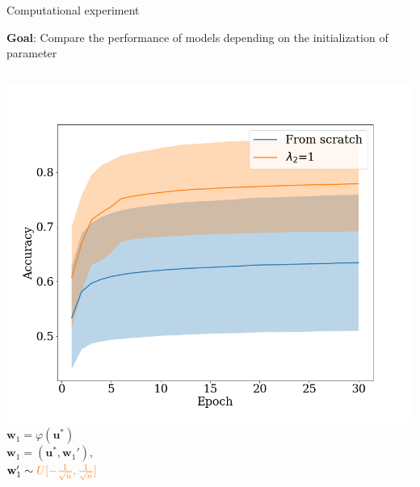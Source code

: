 \documentclass[dvipsnames]{beamer}
\begin{document}
\begin{frame}{Computational experiment}

    \textbf{Goal}: Compare the performance of models depending
on the initialization of parameter
    
    \begin{columns}[c]
    \includegraphics[width=\textwidth]{l2_acc.png}
    $\mathbf{w}_1 = \varphi(\mathbf{u}^*)$ \\
    \bigskip
    $\mathbf{w}_1 = (\mathbf{u}^*, \mathbf{w}_1'), $ \\
    \bigskip
    $\mathbf{w}_1' \sim {\color{orange} U[-\frac{1}{\sqrt{n}}, \frac{1}{\sqrt{n}}]}$
    
    \end{columns}

\end{frame}

\end{document}
